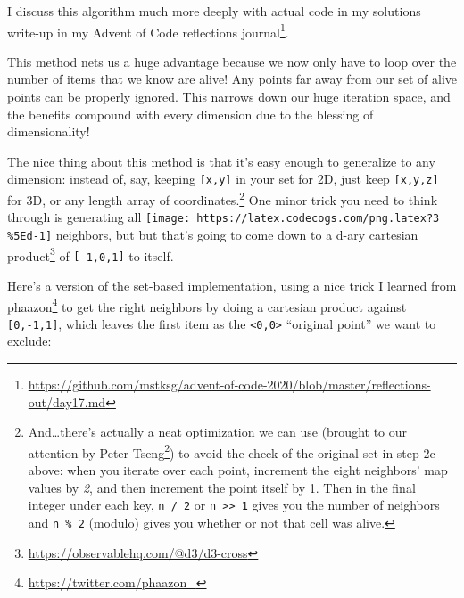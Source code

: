 \documentclass[]{article}
\renewcommand{\href}[2]{#2\footnote{\url{#1}}}
\begin{document}
I discuss this algorithm much more deeply with actual code in
\href{https://github.com/mstksg/advent-of-code-2020/blob/master/reflections-out/day17.md}{my
solutions write-up in my Advent of Code reflections journal}.

This method nets us a huge advantage because we now only have to loop over the
number of items that we know are alive! Any points far away from our set of
alive points can be properly ignored. This narrows down our huge iteration
space, and the benefits compound with every dimension due to the blessing of
dimensionality!

The nice thing about this method is that it's easy enough to generalize to any
dimension: instead of, say, keeping \texttt{{[}x,y{]}} in your set for 2D, just
keep \texttt{{[}x,y,z{]}} for 3D, or any length array of coordinates.\footnote{And\ldots there's
  actually a neat optimization we can use (brought to our attention by
  \href{https://www.reddit.com/r/adventofcode/comments/kfb6zx/day_17_getting_to_t6_at_for_higher_spoilerss/ghmllf8}{Peter
  Tseng}) to avoid the check of the original set in step 2c above: when you
  iterate over each point, increment the eight neighbors' map values by
  \emph{2}, and then increment the point itself by 1. Then in the final integer
  under each key, \texttt{n\ /\ 2} or
  \texttt{n\ \textgreater{}\textgreater{}\ 1} gives you the number of neighbors
  and \texttt{n\ \%\ 2} (modulo) gives you whether or not that cell was alive.}
One minor trick you need to think through is generating all
\texttt{[image: https://latex.codecogs.com/png.latex?3\\\%5Ed-1]} neighbors, but
but that's going to come down to a d-ary
\href{https://observablehq.com/@d3/d3-cross}{cartesian product} of
\texttt{{[}-1,0,1{]}} to itself.

Here's a version of the set-based implementation, using a nice trick I learned
from \href{https://twitter.com/phaazon_}{phaazon} to get the right neighbors by
doing a cartesian product against \texttt{{[}0,-1,1{]}}, which leaves the first
item as the \texttt{\textless{}0,0\textgreater{}} ``original point'' we want to
exclude:
\end{document}
